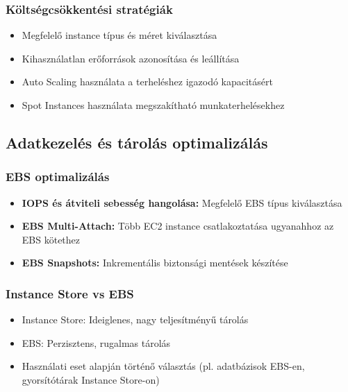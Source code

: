 \documentclass[a4paper,12pt]{article}
\begin{document}
    \subsubsection{Költségcsökkentési stratégiák}

    \begin{itemize}
        \item Megfelelő instance típus és méret kiválasztása
        \item Kihasználatlan erőforrások azonosítása és leállítása
        \item Auto Scaling használata a terheléshez igazodó kapacitásért
        \item Spot Instances használata megszakítható munkaterhelésekhez
    \end{itemize}

    \subsection{Adatkezelés és tárolás optimalizálás}

    \subsubsection{EBS optimalizálás}

    \begin{itemize}
        \item \textbf{IOPS és átviteli sebesség hangolása:} Megfelelő EBS típus kiválasztása
        \item \textbf{EBS Multi-Attach:} Több EC2 instance csatlakoztatása ugyanahhoz az EBS kötethez
        \item \textbf{EBS Snapshots:} Inkrementális biztonsági mentések készítése
    \end{itemize}

    \subsubsection{Instance Store vs EBS}

    \begin{itemize}
        \item Instance Store: Ideiglenes, nagy teljesítményű tárolás
        \item EBS: Perzisztens, rugalmas tárolás
        \item Használati eset alapján történő választás (pl. adatbázisok EBS-en, gyorsítótárak Instance Store-on)
    \end{itemize}
\end{document}
